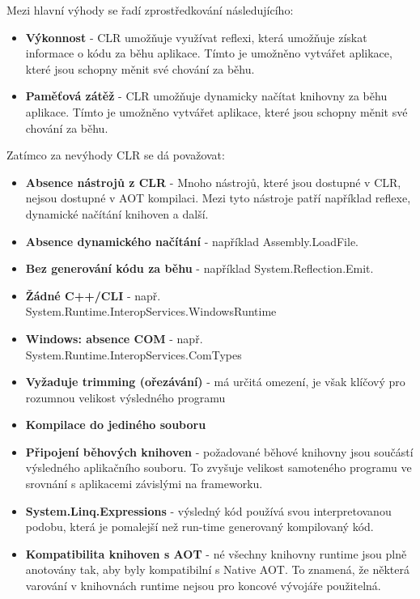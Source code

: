 
Mezi hlavní výhody se řadí zprostředkování následujícího:

\begin{itemize}
    \item  \textbf{Výkonnost} - CLR umožňuje využívat reflexi, která umožňuje získat informace o kódu za běhu aplikace. Tímto je umožněno vytvářet aplikace, které jsou schopny měnit své chování za běhu.
    \item \textbf{Paměťová zátěž} - CLR umožňuje dynamicky načítat knihovny za běhu aplikace. Tímto je umožněno vytvářet aplikace, které jsou schopny měnit své chování za běhu.
\end{itemize}


Zatímco za nevýhody CLR se dá považovat:

\begin{itemize}
    \item  \textbf{Absence nástrojů z CLR} - Mnoho nástrojů, které jsou dostupné v CLR, nejsou dostupné v AOT kompilaci. Mezi tyto nástroje patří například reflexe, dynamické načítání knihoven a další.
    \item \textbf{Absence dynamického načítání} - například Assembly.LoadFile.
    \item \textbf{Bez generování kódu za běhu} - například System.Reflection.Emit.
    \item \textbf{Žádné C++/CLI} - např. System.Runtime.InteropServices.WindowsRuntime
    \item \textbf{Windows: absence COM} - např. System.Runtime.InteropServices.ComTypes
    \item \textbf{Vyžaduje trimming (ořezávání)} - má určitá omezení, je však klíčový pro rozumnou velikost výsledného programu
    \item \textbf{Kompilace do jediného souboru} 
    \item \textbf{Připojení běhových knihoven} - požadované běhové knihovny jsou součástí výsledného aplikačního souboru. To zvyšuje velikost samoteného programu ve srovnání s aplikacemi závislými na frameworku.
    \item \textbf{System.Linq.Expressions} - výsledný kód používá svou interpretovanou podobu, která je pomalejší než run-time generovaný kompilovaný kód.
    \item \textbf{Kompatibilita knihoven s AOT} - né všechny knihovny runtime jsou plně anotovány tak, aby byly kompatibilní s Native AOT. To znamená, že některá varování v knihovnách runtime nejsou pro koncové vývojáře použitelná.
\end{itemize}

